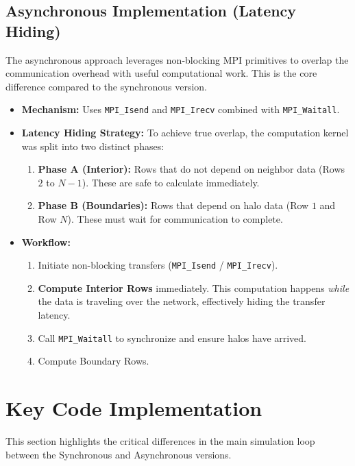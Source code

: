 \documentclass[12pt]{article}
\begin{document}
\subsection{Asynchronous Implementation (Latency Hiding)}
The asynchronous approach leverages non-blocking MPI primitives to overlap the communication overhead with useful computational work. This is the core difference compared to the synchronous version.

\begin{itemize}
    \item \textbf{Mechanism:} Uses \texttt{MPI\_Isend} and \texttt{MPI\_Irecv} combined with \texttt{MPI\_Waitall}.
    \item \textbf{Latency Hiding Strategy:} To achieve true overlap, the computation kernel was split into two distinct phases:
    \begin{enumerate}
        \item \textbf{Phase A (Interior):} Rows that do not depend on neighbor data (Rows $2$ to $N-1$). These are safe to calculate immediately.
        \item \textbf{Phase B (Boundaries):} Rows that depend on halo data (Row $1$ and Row $N$). These must wait for communication to complete.
    \end{enumerate}
    \item \textbf{Workflow:}
    \begin{enumerate}
        \item Initiate non-blocking transfers (\texttt{MPI\_Isend} / \texttt{MPI\_Irecv}).
        \item \textbf{Compute Interior Rows} immediately. This computation happens \textit{while} the data is traveling over the network, effectively hiding the transfer latency.
        \item Call \texttt{MPI\_Waitall} to synchronize and ensure halos have arrived.
        \item Compute Boundary Rows.
    \end{enumerate}
\end{itemize}

\section{Key Code Implementation}

This section highlights the critical differences in the main simulation loop between the Synchronous and Asynchronous versions.
\end{document}
